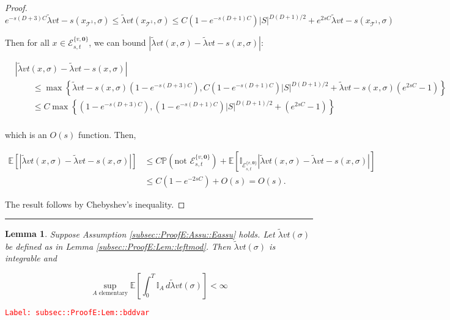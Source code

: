 \documentclass[12pt]{article}
\newcommand{\mb}{\mathbb}
\newcommand{\mc}{\mathcal}
\newcommand{\te}{\text}
\newcommand{\tr}{\textcolor{red}}
\newcommand{\labe}[1]{\tr{\texttt{Label: #1}}}
\newcommand{\lin}{\rule{\linewidth}{0.4 pt}}
\newcommand{\pr}{\mb{P}}							%
\newcommand{\ex}[1]{\mb{E}\left[#1\right]}			%
\renewcommand{\root}{\mathbf{0}}				%
\renewcommand{\v}{v}							%
\renewcommand{\S}{S}							%
\newcommand{\s}{\sigma}							%
\newcommand{\T}{T}								%
\newcommand{\x}{x}								%
\renewcommand{\t}{t}							%
\renewcommand{\tt}{s}							%
\newcommand{\cind}[1]{_{#1}}					%
\newcommand{\tip}[1]{#1}						%
\newcommand{\const}{C}							%
\newcommand{\degr}{D}							%
\newcommand{\tree}{\mc{T}}						%
\newcommand{\sln}[1]{^{#1}}						%
\newcommand{\alt}[1]{\widetilde{#1}}			%
\newcommand{\evnt}{\mc{E}}						%
\newcommand{\typset}{A}							%
\newcommand{\crate}{\alt{\lambda}}				%
\newtheorem{lem}[thms]{Lemma}
\begin{document}
\begin{proof}
\[e^{-\tt(\degr+3)\const{}}\crate{\v}{\t-\tt}(\x\cind{\tree\sln{1}}\tip{},\s) \leq \crate{\v}{\t}(\x\cind{\tree\sln{1}}\tip{},\s) \leq \const{}(1 - e^{-\tt(\degr+1)\const{}})|\S|^{\degr(\degr+1)/2} + e^{2\tt\const{}}\crate{\v}{\t-\tt}(\x\cind{\tree\sln{1}}\tip{},\s)\]

Then for all \(\x\cind{}\tip{} \in \evnt{}^{\{\v,\root\}}_{\tt,\t}\), we can bound \(|\crate{\v}{\t}(\x\cind{}\tip{},\s) - \crate{\v}{\t-\tt}(\x\cind{}\tip{},\s)|\):

\begin{align*}
&|\crate{\v}{\t}(\x\cind{}\tip{},\s) - \crate{\v}{\t-\tt}(\x\cind{}\tip{},\s)| \\
&\hspace{24pt}\leq \max\left\{\crate{\v}{\t-\tt}(\x\cind{}\tip{},\s)\left(1 - e^{-\tt(\degr+3)\const{}}\right),\const{}(1-e^{-\tt(\degr+1)\const{}})|\S|^{\degr(\degr+1)/2} + \crate{\v}{\t-\tt}(\x\cind{}\tip{},\s)\left(e^{2\tt\const{}} - 1\right)\right\}\\
&\hspace{24pt}\leq \const{}\max\left\{\left(1 - e^{-\tt(\degr+3)\const{}}\right),(1-e^{-\tt(\degr+1)\const{}})|\S|^{\degr(\degr+1)/2} + \left(e^{2\tt\const{}} - 1\right)\right\}\\
\end{align*}

which is an \(O(\tt)\) function. Then,

\begin{align*}
\ex{|\crate{\v}{\t}(\x\cind{}\tip{},\s) - \crate{\v}{\t-\tt}(\x\cind{}\tip{},\s)|} &\leq \const{}\pr\left(\te{not }\evnt{}^{\{\v,\root\}}_{\tt,\t}\right) + \ex{\mb{I}_{\evnt{}^{\{\v,\root\}}_{\tt,\t}}|\crate{\v}{\t}(\x\cind{}\tip{},\s) - \crate{\v}{\t-\tt}(\x\cind{}\tip{},\s)|}\\
&\leq \const{}(1 - e^{-2\tt\const{}}) + O(\tt) = O(\tt).
\end{align*}

The result follows by Chebyshev's inequality.
\end{proof}

\lin

\begin{lem}
Suppose Assumption \ref{subsec::ProofE:Assu::Eassu} holds. Let \(\crate{\v}{\t}(\s)\) be defined as in Lemma \ref{subsec::ProofE:Lem::leftmod}. Then \(\crate{\v}{\t}(\s)\) is integrable and 

\[\sup_{\typset\te{ elementary}} \ex{\int_0^\T \mb{I}_\typset\,d\crate{\v}{\t}(\s)} < \infty\]
\label{subsec::ProofE:Lem::bddvar}
\end{lem}
\labe{subsec::ProofE:Lem::bddvar}
\end{document}
